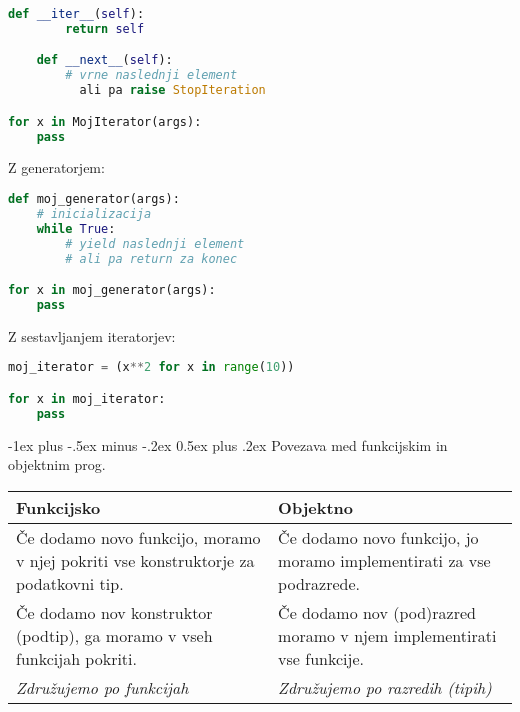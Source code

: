 \documentclass[a3paper,9pt]{extarticle}
\makeatletter
\renewcommand{\section}{\@startsection{section}{1}{0mm}%
                                {-1ex plus -.5ex minus -.2ex}%
                                {0.5ex plus .2ex}%
                                {\normalfont\large\bfseries}}
\makeatother
\begin{document}
\begin{multicols}{4}
\begin{lstlisting}[language=Python]
    def __iter__(self):
        return self

    def __next__(self):
        # vrne naslednji element 
          ali pa raise StopIteration

for x in MojIterator(args):
    pass
\end{lstlisting}

Z generatorjem:
\begin{lstlisting}[language=Python]
def moj_generator(args):
    # inicializacija
    while True:
        # yield naslednji element
        # ali pa return za konec

for x in moj_generator(args):
    pass        
\end{lstlisting}

Z sestavljanjem iteratorjev:
\begin{lstlisting}[language=Python]
moj_iterator = (x**2 for x in range(10))

for x in moj_iterator:
    pass
\end{lstlisting}

\section{Povezava med funkcijskim in objektnim prog.}
\begin{tabular}{@{}p{4.3cm}p{4.3cm}@{}}
    \textbf{Funkcijsko} & \textbf{Objektno}\\ \hline
    Če dodamo novo funkcijo, moramo v njej pokriti vse konstruktorje za podatkovni tip. &
    Če dodamo novo funkcijo, jo moramo implementirati za vse podrazrede. \\ \hline
    Če dodamo nov konstruktor (podtip), ga moramo v vseh funkcijah pokriti. &
    Če dodamo nov (pod)razred moramo v njem implementirati vse funkcije. \\ \hline
    \emph{Združujemo po funkcijah} & \emph{Združujemo po razredih (tipih)} \\
\end{tabular}

\end{multicols}
\end{document}
